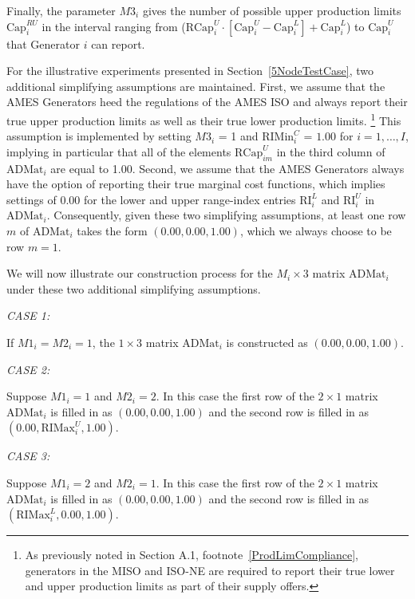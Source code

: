 \documentclass[12pt]{article}
\begin{document}
	Finally, the parameter $M3_i$ gives the number of possible upper production limits 
$\mbox{Cap}^{RU}_i$ in the interval ranging from 
($\mbox{RCap}_i^{U} \cdot [\mbox{Cap}_{i}^U -  \mbox{Cap}_{i}^L ] + \mbox{Cap}_{i}^L$) 
to $\mbox{Cap}^U_i$ that Generator $i$ can report.  
	
For the illustrative experiments presented in Section~\ref{5NodeTestCase}, two additional simplifying assumptions are maintained.  First, we assume that the AMES Generators heed the regulations of the AMES ISO and always report their true upper production limits as well as their true lower production limits.%
              \footnote{As previously noted in Section A.1, footnote~\ref{ProdLimCompliance}, 
              generators in the MISO and  ISO-NE are required to report their true lower and upper  
              production limits as part of their supply offers.}
This assumption is implemented by setting $M3_i$ = 1 and $\mbox{RIMin}^C_i$ = $1.00$ for $i=1,\ldots,I$, implying in particular that all of the elements $\mbox{RCap}^{U}_{im}$ in the third column of $\mbox{ADMat}_i$ are equal to 1.00.  Second, we assume that the AMES Generators always have the option of reporting their true marginal cost functions, which implies settings of $0.00$ for the lower and upper range-index entries $\mbox{RI}^L_i$ and 
$\mbox{RI}^U_i$ in $\mbox{ADMat}_i$.  Consequently, given these two simplifying assumptions, at least one row $m$ of $\mbox{ADMat}_i$ takes the form $(0.00,0.00,1.00)$, which we always choose to be row $m=1$. 

We will now illustrate our construction process for the $M_i \times 3$ matrix $\mbox{ADMat}_i$ under these two additional simplifying assumptions.

\vspace*{3mm}
\noindent
\textit{CASE 1:\/}


If $M1_i = M2_i = 1$, the $1\times 3$ matrix $\mbox{ADMat}_i$ is constructed as $(0.00,0.00,1.00)$.  

\vspace*{3mm}
\noindent
\textit{CASE 2:\/}

Suppose $M1_i = 1$ and $M2_i = 2$.  In this case the first row of the $2\times 1$ matrix $\mbox{ADMat}_i$ is filled in as $(0.00,0.00,1.00)$ and the second row is filled in as $(0.00, \mbox{RIMax}^U_i, 1.00)$.  


\vspace*{3mm}
\noindent
\textit{CASE 3:\/}

Suppose $M1_i = 2$ and $M2_i = 1$.  In this case the first row of the $2\times 1$ matrix $\mbox{ADMat}_i$ is filled in as $(0.00,0.00,1.00)$ and the second row is filled in as $(\mbox{RIMax}^L_i, 0.00, 1.00)$. 
\end{document}
